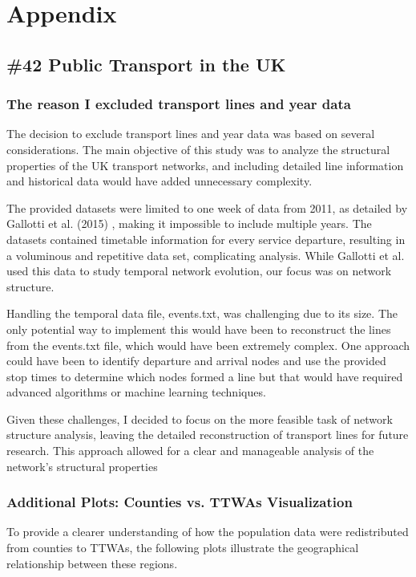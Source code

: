 \chapter{Appendix}

\section{\#42 Public Transport in the UK}


\subsection*{The reason I excluded transport lines and year data}
The decision to exclude transport lines and year data was based on several considerations. The main objective of this study was to analyze the structural properties of the UK transport networks, and including detailed line information and historical data would have added unnecessary complexity.

The provided datasets were limited to one week of data from 2011, as detailed by Gallotti et al. (2015) \cite{gallotti2015}, making it impossible to include multiple years. The datasets contained timetable information for every service departure, resulting in a voluminous and repetitive data set, complicating analysis. While Gallotti et al. used this data to study temporal network evolution, our focus was on network structure.

Handling the temporal data file, events.txt, was challenging due to its size. The only potential way to implement this would have been to reconstruct the lines from the events.txt file, which would have been extremely complex. One approach could have been to identify departure and arrival nodes and use the provided stop times to determine which nodes formed a line but that would have required advanced algorithms or machine learning techniques. 


Given these challenges, I decided to focus on the more feasible task of network structure analysis, leaving the detailed reconstruction of transport lines for future research. This approach allowed for a clear and manageable analysis of the network's structural properties





\subsection*{Additional Plots: Counties vs. TTWAs Visualization}
To provide a clearer understanding of how the population data were redistributed from counties to TTWAs, the following plots illustrate the geographical relationship between these regions.

